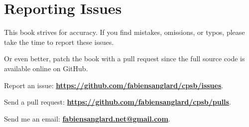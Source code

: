 \chapter*{Reporting Issues}
This book strives for accuracy. If you find mistakes, omissions, or typos, please take the time to report these issues. 

Or even better, patch the book with a pull request since the full source code is available online on GitHub.


Report an issue: \textbf{\href{https://github.com/fabiensanglard/cpsb/issues}{https://github.com/fabiensanglard/cpsb/issues}}.

Send a pull request: \textbf{\href{https://github.com/fabiensanglard/cpsb/pulls}{https://github.com/fabiensanglard/cpsb/pulls}}.

Send me an email: \textbf{\href{mailto:fabiensanglard.net@gmail.com}{fabiensanglard.net@gmail.com}}.
